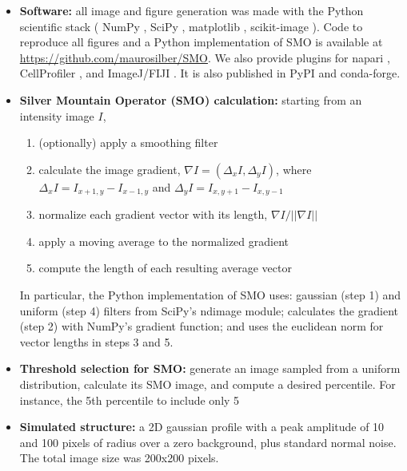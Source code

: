 \documentclass[article]{jss}
\begin{document}
\begin{itemize}

\item	\textbf{Software:} all image and figure generation was made with the Python scientific stack (
	NumPy \citep{Harris2020},
	SciPy \citep{Virtanen2020},
	matplotlib \citep{Hunter2007},
	scikit-image \citep{skimage2014}
).
Code to reproduce all figures
and a Python implementation of SMO
is available at \url{https://github.com/maurosilber/SMO}.
We also provide plugins for
napari \citep{napari2019},
CellProfiler \citep{Stirling2021},
and ImageJ/FIJI \citep{Schindelin2012}.
It is also published in PyPI and conda-forge.

\item	\textbf{Silver Mountain Operator (SMO) calculation:} starting from an intensity image $I$,
	\begin{enumerate} 
	\item (optionally) apply a smoothing filter
	\item calculate the image gradient,
		$\nabla I = (\Delta_x I, \Delta_y I)$,
		where $\Delta_x I = I_{x+1, y} - I_{x-1, y}$
		and   $\Delta_y I = I_{x, y+1} - I_{x, y-1}$
	\item normalize each gradient vector with its length,
		$\nabla I / || \nabla I ||$
	\item apply a moving average to the normalized gradient
	\item compute the length of each resulting average vector
	\end{enumerate}

	In particular, the Python implementation of SMO uses: gaussian (step 1) and uniform (step 4) filters from SciPy’s ndimage module; calculates the gradient (step 2) with NumPy’s gradient function; and uses the euclidean norm for vector lengths in steps 3 and 5.

\item	\textbf{Threshold selection for SMO:} generate an image sampled from a uniform distribution, calculate its SMO image, and compute a desired percentile. For instance, the 5th percentile to include only 5%

\item	\textbf{Simulated structure:} a 2D gaussian profile with a peak amplitude of 10 and 100 pixels of radius over a zero background, plus standard normal noise. The total image size was 200x200 pixels.


\end{itemize}
\end{document}
